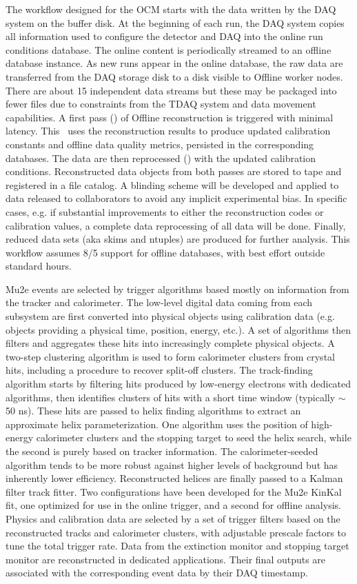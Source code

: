 The workflow designed for the OCM starts with the data written by the DAQ system on the buffer disk. At the beginning of each run, the DAQ system copies all information used to configure the detector and DAQ into the online run conditions database. The online content is periodically streamed to an offline database instance. As new runs appear in the online database, the raw data are transferred from the DAQ storage disk to a disk visible to Offline worker nodes. There are about 15 independent data streams but these may be packaged into fewer files due to constraints from the TDAQ system and data movement capabilities. A first pass (\passone) of Offline reconstruction is triggered with minimal latency. This \passone\ uses the reconstruction results to produce updated calibration constants and offline data quality metrics, persisted in the corresponding databases. The data are then reprocessed (\passtwo) with the updated calibration conditions. Reconstructed data objects from both passes are stored to tape and registered in a file catalog. A blinding scheme will be developed and applied to data released to collaborators to avoid any implicit experimental bias. In specific cases, e.g. if substantial improvements to either the reconstruction codes or calibration values, a complete data reprocessing of all data will be done. Finally, reduced data sets (aka skims and ntuples) are produced for further analysis. This workflow assumes 8/5 support for offline databases, with best effort outside standard hours.

Mu2e events are selected by trigger algorithms based mostly on information from the tracker and calorimeter. The low-level digital data coming from each subsystem are first converted into physical objects using calibration data (e.g. objects providing a physical time, position, energy, etc.). A set of algorithms then filters and aggregates these hits into increasingly complete physical objects. A two-step clustering algorithm is used to form calorimeter clusters from crystal hits, including a procedure to recover split-off clusters. The track-finding algorithm starts by filtering hits produced by low-energy electrons with dedicated algorithms, then identifies clusters of hits with a short time window (typically $\sim$50 ns). These hits are passed to helix finding algorithms to extract an approximate helix parameterization. One algorithm uses the position of high-energy calorimeter clusters and the stopping target to seed the helix search, while the second is purely based on tracker information. The calorimeter-seeded algorithm tends to be more robust against higher levels of background but has inherently lower efficiency. Reconstructed helices are finally passed to a Kalman filter track fitter. Two configurations have been developed for the Mu2e KinKal fit, one optimized for use in the online trigger, and a second for offline analysis. Physics and calibration data are selected by a set of trigger filters based on the reconstructed tracks and calorimeter clusters, with adjustable prescale factors to tune the total trigger rate. Data from the extinction monitor and stopping target monitor are reconstructed in dedicated applications. Their final outputs are associated with the corresponding event data by their DAQ timestamp. 

